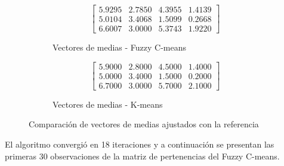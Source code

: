 \documentclass[11pt, letterpaper]{article}
\begin{document}
\begin{figure}[h!]
	\centering
	\begin{subfigure}[t]{0.45\textwidth}
		\centering
		\[
		\begin{bmatrix}
			5.9295 & 2.7850 & 4.3955 & 1.4139 \\
			5.0104 & 3.4068 & 1.5099 & 0.2668 \\
			6.6007 & 3.0000 & 5.3743 & 1.9220
		\end{bmatrix}
		\]
		\caption{Vectores de medias - Fuzzy C-means}
	\end{subfigure}
	\hspace{0.05\textwidth}
	\begin{subfigure}[t]{0.45\textwidth}
		\centering
		\[
		\begin{bmatrix}
			5.9000 & 2.8000 & 4.5000 & 1.4000 \\
			5.0000 & 3.4000 & 1.5000 & 0.2000 \\
			6.7000 & 3.0000 & 5.7000 & 2.1000
		\end{bmatrix}
		\]
		\caption{Vectores de medias - K-means}
	\end{subfigure}
	\caption{Comparación de vectores de medias ajustados con la referencia}
\end{figure}

\newpage

El algoritmo convergió  en 18 iteraciones y a continuación se presentan las primeras 30 observaciones de la matriz de pertenencias del Fuzzy C-means.
\end{document}
